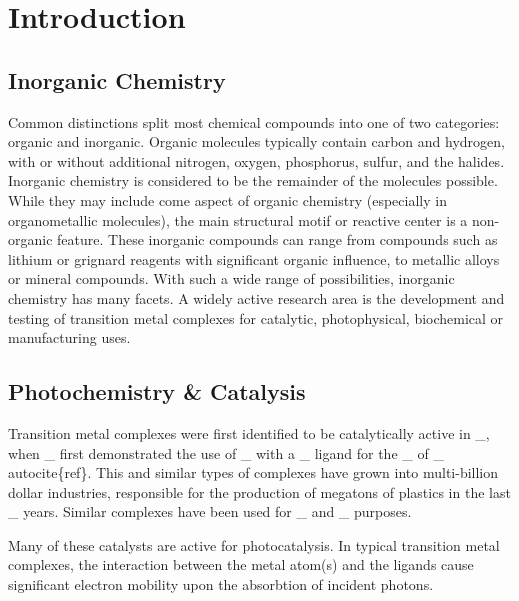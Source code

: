 \chapter{Introduction}
\section{Inorganic Chemistry}

Common distinctions split most chemical compounds into one of two categories: organic and inorganic. Organic molecules typically contain carbon and hydrogen, with or without additional nitrogen, oxygen, phosphorus, sulfur, and the halides. Inorganic chemistry is considered to be the remainder of the molecules possible. While they may include come aspect of organic chemistry (especially in organometallic molecules), the main structural motif or reactive center is a non-organic feature. These inorganic compounds can range from compounds such as lithium or grignard reagents with significant organic influence, to metallic alloys or mineral compounds. With such a wide range of possibilities, inorganic chemistry has many facets. A widely active research area is the development and testing of transition metal complexes for catalytic, photophysical, biochemical or manufacturing uses.
\section{Photochemistry \& Catalysis}

Transition metal complexes were first identified to be catalytically active in \_, when \_ first demonstrated the use of \_ with a \_ ligand for the \_ of \_ \/autocite\{ref\}. This and similar types of complexes have grown into multi-billion dollar industries, responsible for the production of megatons of plastics in the last \_ years. Similar complexes have been used for \_ and \_ purposes.

Many of these catalysts are active for photocatalysis. In typical transition metal complexes, the interaction between the metal atom(s) and the ligands cause significant electron mobility upon the absorbtion of incident photons. 
